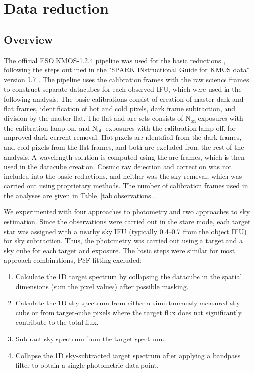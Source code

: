 \documentclass[useAMS,usenatbib]{mn2e}
\begin{document}
\section{Data reduction}
\label{sec:reduction}
\subsection{Overview}
\label{sec:reduction:overview}

The official ESO KMOS-1.2.4 pipeline was used for the basic reductions \citep[detailed in][]{Davies2013}, following the
steps outlined in the "SPARK INstructional Guide for KMOS data" version 0.7 \citep{Fairley2012}. The pipeline uses the
calibration frames with the raw science frames to construct separate datacubes for each observed IFU, which were used in
the following analysis. The basic calibrations consist of creation of master dark and flat frames, identification of hot
and cold pixels, dark frame subtraction, and division by the master flat. The flat and arc sets consists of
N$_\mathrm{on}$ exposures with the calibration lamp on, and N$_\mathrm{off}$ exposures with the calibration lamp off,
for improved dark current removal. Hot pixels are identified from the dark frames, and cold pixels from the flat frames,
and both are excluded from the rest of the analysis. A wavelength solution is computed using the arc frames, which is
then used in the datacube creation. Cosmic ray detection and correction was not included into the basic reductions, and
neither was the sky removal, which was carried out using proprietary methods. The number of calibration frames used in
the analyses are given in Table~\ref{tab:observations}.

We experimented with four approaches to photometry and two approaches to sky estimation. Since the observations were
carried out in the stare mode, each target star was assigned with a nearby sky IFU (typically 0.4\arcmin{}--0.7\arcmin{}
from the object IFU) for sky subtraction. Thus, the photometry was carried out using a target and a sky cube for each
target and exposure. The basic steps were similar for most approach combinations, PSF fitting excluded: 
\begin{enumerate}
 \item Calculate the 1D target spectrum by collapsing the datacube in the spatial dimensions (sum the pixel values) 
       after possible masking.
 \item Calculate the 1D sky spectrum from either a simultaneously measured sky-cube or from target-cube pixels where 
       the target flux does not significantly contribute to the total flux.
 \item Subtract sky spectrum from the target spectrum.
 \item Collapse the 1D sky-subtracted target spectrum after applying a bandpass filter to obtain a single photometric 
data point.
\end{enumerate}
\end{document}
